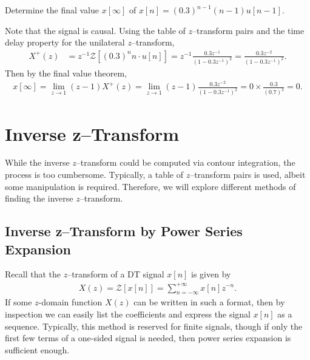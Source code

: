 \documentclass{report}
\begin{document}
\begin{example}
    Determine the final value $x[\infty]$ of $x[n]=(0.3)^{n-1}(n-1)u[n-1]$.
\end{example}
\begin{solution}
    Note that the signal is causal. Using the table of $z$--transform pairs and the time delay property for the unilateral $z$--transform, 
    \begin{align*}
        X^+(z) &= z^{-1} \mathcal{Z}[(0.3)^n n\cdot u[n]] = z^{-1}\frac{0.3z^{-1}}{(1-0.3z^{-1})^2} = \frac{0.3z^{-2}}{(1-0.3z^{-1})^2}.
    \end{align*}
    Then by the final value theorem,
    \begin{align*}
        x[\infty] = \lim_{z\to 1} (z-1)X^+(z) = \lim_{z\to 1} (z-1)\frac{0.3z^{-2}}{(1-0.3z^{-1})^2} = 0\times \frac{0.3}{(0.7)^2} = 0.
    \end{align*}
\end{solution}

\section{Inverse z--Transform}
While the inverse $z$--transform could be computed via contour integration, the process is too cumbersome. Typically, a table of $z$--transform pairs is 
used, albeit some manipulation is required. Therefore, we will explore different methods of finding the inverse $z$--transform.

\subsection{Inverse z--Transform by Power Series Expansion}
Recall that the $z$--transform of a DT signal $x[n]$ is given by 
\begin{align}
    X(z) = \mathcal{Z}[x[n]] = \sum_{n=-\infty}^{+\infty} x[n] z^{-n}.
\end{align}
If some $z$-domain function $X(z)$ can be written in such a format, then by inspection we can easily list the coefficients and express the signal $x[n]$ 
as a sequence. Typically, this method is reserved for finite signals, though if only the first few terms of a one-sided signal is needed, then power series expansion 
is sufficient enough.
\end{document}
